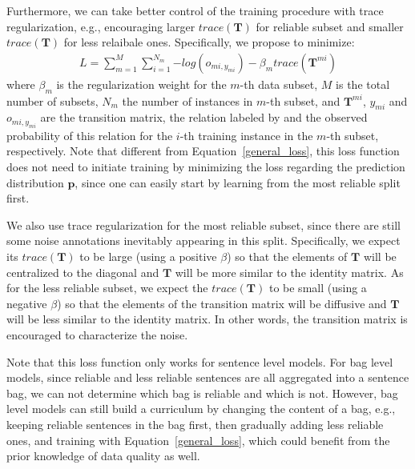 Furthermore, we can take better control of the training procedure with trace regularization, e.g., encouraging larger $trace (\mathbf{T})$ for reliable subset and smaller $trace (\mathbf{T})$ for less relaibale ones.
Specifically, we propose to minimize:
%
\begin{equation}
\begin{aligned}
L=\sum_{m=1}^M{\sum_{i=1}^{N_m}{-log(o_{mi,y_{mi}})}} - \beta_m trace(\mathbf{T}^{mi})
\end{aligned}
\end{equation}
where $\beta_m$ is the regularization weight for the $m$-th data subset, $M$ is the total number of subsets, $N_m$ the number of instances in $m$-th subset, and  $\mathbf{T}^{mi}$, $y_{mi}$ and $o_{mi,y_{mi}}$ are the transition matrix, the relation labeled by \DS and the observed probability of this relation for the $i$-th training instance in the $m$-th subset, respectively. Note that different from Equation~\ref{general_loss}, this loss function does not need to initiate training by
minimizing the loss regarding the prediction distribution $\mathbf{p}$, since one can easily start by learning from the most reliable split first. 


We also use trace regularization for the most reliable subset, since there are still some noise annotations inevitably appearing in this split. 
Specifically, we expect its $trace(\mathbf{T})$ to be large (using a positive $\beta$) so that the elements of $\mathbf{T}$ will be centralized to the diagonal and $\mathbf{T}$ will be more similar to the identity matrix. As for the  less reliable subset, we expect the $trace (\mathbf{T})$ to be small (using a negative $\beta$) so that the elements of the transition matrix will be diffusive and $\mathbf{T}$  will be less similar to the identity matrix. In other words, the transition matrix is encouraged to characterize the noise.

Note that this loss function only works for sentence level models. For bag level models, since reliable and less reliable sentences are all aggregated into a sentence bag,  we can not determine which bag is reliable and which is not. However, bag level models can still build a curriculum by changing the content of a bag, e.g., keeping reliable sentences in the bag first, then gradually adding less reliable ones, and training with Equation~\ref{general_loss}, which could benefit from the prior knowledge of data quality as well.



